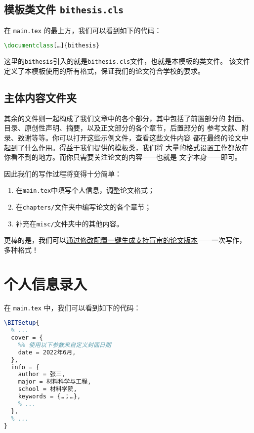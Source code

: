 \subsection{模板类文件 \texttt{bithesis.cls}}

在 \texttt{main.tex} 的最上方，我们可以看到如下的代码：
\begin{lstlisting}[language=TeX]
\documentclass[…]{bithesis}
\end{lstlisting}
这里的\texttt{bithesis}引入的就是\texttt{bithesis.cls}文件，也就是本模板的类文件。
该文件定义了本模板使用的所有格式，保证我们的论文符合学校的要求。

\subsection{主体内容文件夹}

其余的文件则一起构成了我们文章中的各个部分，其中包括了前置部分的
封面、目录、原创性声明、摘要，以及正文部分的各个章节，后置部分的
参考文献、附录、致谢等等。你可以打开这些示例文件，查看这些文件内容
都在最终的论文中起到了什么作用。得益于我们提供的模板类，我们将
大量的格式设置工作都放在你看不到的地方。而你只需要关注论文的内容——也就是
文字本身——即可。

因此我们的写作过程将变得十分简单：
\begin{enumerate}
  \item 在\texttt{main.tex}中填写个人信息，调整论文格式；
  \item 在\texttt{chapters/}文件夹中编写论文的各个章节；
  \item 补充在\texttt{misc/}文件夹中的其他内容。
\end{enumerate}

更棒的是，我们可以\hyperref[sec:blind]{通过修改配置一键生成支持盲审的论文版本}——一次写作，
多种格式！

\section{个人信息录入}
\label{sec:BITSetup}

在 \texttt{main.tex} 中，我们可以看到如下的代码：
\begin{lstlisting}[language=TeX]
\BITSetup{
  % ...
  cover = {
    %% 使用以下参数来自定义封面日期
    date = 2022年6月,
  },
  info = {
    author = 张三,
    major = 材料科学与工程,
    school = 材料学院,
    keywords = {…；…},
    % ...
  },
  % ...
}
\end{lstlisting}

